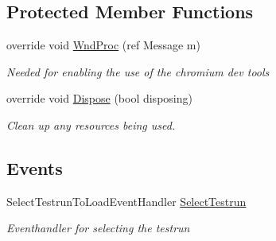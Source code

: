 \subsection*{Protected Member Functions}
\begin{DoxyCompactItemize}
\item 
override void \hyperlink{class_web_analyzer_1_1_u_i_1_1_select_testrun_form_a33ab94419d2cedd042a3a6894c060e8f}{Wnd\+Proc} (ref Message m)
\begin{DoxyCompactList}\small\item\em Needed for enabling the use of the chromium dev tools \end{DoxyCompactList}\item 
override void \hyperlink{class_web_analyzer_1_1_u_i_1_1_select_testrun_form_a5cef96e7db81ffcde7521e814bbcec79}{Dispose} (bool disposing)
\begin{DoxyCompactList}\small\item\em Clean up any resources being used. \end{DoxyCompactList}\end{DoxyCompactItemize}
\subsection*{Events}
\begin{DoxyCompactItemize}
\item 
Select\+Testrun\+To\+Load\+Event\+Handler \hyperlink{class_web_analyzer_1_1_u_i_1_1_select_testrun_form_a21a81e06c20de7a18979a8c4c7ded945}{Select\+Testrun}
\begin{DoxyCompactList}\small\item\em Eventhandler for selecting the testrun \end{DoxyCompactList}\end{DoxyCompactItemize}
